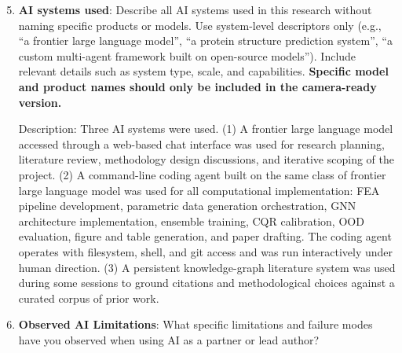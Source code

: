 \documentclass{article}
\begin{document}
\begin{enumerate}
    \setcounter{enumi}{4}

    \item \textbf{AI systems used}: Describe all AI systems used in this research without naming specific products or models. Use system-level descriptors only (e.g., ``a frontier large language model'', ``a protein structure prediction system'', ``a custom multi-agent framework built on open-source models''). Include relevant details such as system type, scale, and capabilities. \textbf{Specific model and product names should only be included in the camera-ready version.}

    Description: Three AI systems were used. (1) A frontier large language model accessed through a web-based chat interface was used for research planning, literature review, methodology design discussions, and iterative scoping of the project. (2) A command-line coding agent built on the same class of frontier large language model was used for all computational implementation: FEA pipeline development, parametric data generation orchestration, GNN architecture implementation, ensemble training, CQR calibration, OOD evaluation, figure and table generation, and paper drafting. The coding agent operates with filesystem, shell, and git access and was run interactively under human direction. (3) A persistent knowledge-graph literature system was used during some sessions to ground citations and methodological choices against a curated corpus of prior work.

    \item \textbf{Observed AI Limitations}: What specific limitations and failure modes have you observed when using AI as a partner or lead author?


\end{enumerate}
\end{document}
